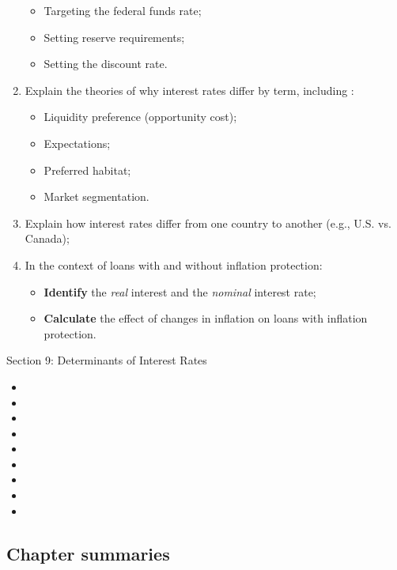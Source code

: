 \begin{outcomes}
\begin{enumerate}[label = \alph*)]
\begin{itemize}
		\item	Targeting the federal funds rate;
		\item	Setting reserve requirements;
		\item	Setting the discount rate.
		\end{itemize}
	\item	Explain the theories of why interest rates differ by term, including :
		\begin{itemize}
		\item	Liquidity preference (opportunity cost);
		\item	Expectations;
		\item	Preferred habitat; 
		\item	Market segmentation.
		\end{itemize}
	\item	Explain how interest rates differ from one country to another (e.g., U.S. vs. Canada);
	\item	In the context of loans with and without inflation protection:
		\begin{itemize}
		\item	\textbf{Identify} the \textit{real} interest and the \textit{nominal} interest rate;
		\item	\textbf{Calculate} the effect of changes in inflation on loans with inflation protection.
		\end{itemize}
\end{enumerate}
\end{outcomes}

\begin{ASM_chapter}
Section 9: Determinants of Interest Rates
\begin{itemize}
	\item	{}
	\item	{}
	\item	{}
	\item	{}
	\item	{}
	\item	{}
	\item	{}
	\item	{}
	\item	{}
\end{itemize}
\end{ASM_chapter}

\subsection{Chapter summaries}

